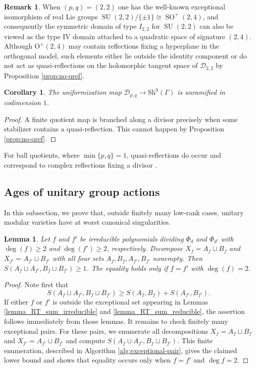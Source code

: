 \documentclass[11pt]{amsart}
\theoremstyle{plain}
\newtheorem{lem}[thm]{Lemma}
\newtheorem{cor}[thm]{Corollary}
\theoremstyle{definition}
\newtheorem{rem}[thm]{Remark}
\numberwithin{equation}{section}
\def\SU{\mathop{\mathrm{SU}}\nolimits}
\def\SO{\mathop{\mathrm{SO}}\nolimits}
\def\SU{\mathop{\mathrm{SU}}\nolimits}
\def\O{\mathrm{O}}
\begin{document}
\begin{rem}
  When $(p,q)=(2,2)$ one has the well-known exceptional isomorphism of real Lie groups
    $\SU(2,2)/\{\pm 1\}  \cong \SO^+(2,4)$,
  and consequently the symmetric domain of type $I_{2,2}$ for $\SU(2,2)$ can also be viewed as the
  type IV domain attached to a quadratic space of signature $(2,4)$.
  Although $\O^+(2,4)$ may contain reflections fixing a hyperplane in the orthogonal model, such elements either lie outside the identity component or do not
  act as quasi-reflections on the holomorphic tangent space of $\mathcal{D}_{2,2}$ by Proposition \ref{prop:no-qref}.
\end{rem}

\begin{cor}\label{cor:branch-codimge2}
  The uniformization map $\mathcal{D}_{p,q}\to \mathrm{Sh}^0(\Gamma)$ is unramified in codimension $1$.
\end{cor}

\begin{proof}
  A finite quotient map is branched along a divisor precisely when some stabilizer contains a quasi-reflection.
  This cannot happen by Proposition \ref{prop:no-qref}.
\end{proof}
For ball quotients, where $\min\{p,q\}=1$, quasi-reflections do occur and correspond
to complex reflections fixing a divisor \cites{behrens2012singularities,maeda2024reflective}.

\subsection{Ages of unitary group actions}
\label{sec:ages_unitary_actions}
In this subsection, we prove that, outside finitely many low-rank cases, unitary modular varieties have at worst canonical singularities.

\begin{lem}\label{lemma_S_AA_BB}
  Let $f$ and $f'$ be irreducible polynomials dividing $\Phi_d$ and $\Phi_{d'}$ with $\deg(f) \geq 2$ and $\deg(f') \geq 2$, respectively.
  Decompose $X_f=A_f\sqcup B_f$ and $X_{f'}=A_{f'}\sqcup B_{f'}$
  with all four sets $A_f,B_f,A_{f'},B_{f'}$ nonempty.  Then $S(A_f \sqcup A_{f'}, B_{f} \sqcup B_{f'}) \geq 1$.
  The equality holds only if $f=f'$ with $\deg(f) =2$.
\end{lem}
\begin{proof}
  Note first that
  \[
    S(A_f \sqcup A_{f'}, B_f \sqcup B_{f'}) \geq S(A_f, B_f) + S(A_{f'},B_{f'}).
  \]
  If either $f$ or $f'$ is outside the exceptional set appearing in Lemmas \ref{lemma_RT_sum_irreducible} and \ref{lemma_RT_sum_reducible}, the assertion follows immediately from those lemmas. It remains to check finitely many exceptional pairs. For these pairs, we enumerate all decompositions $X_f=A_f\sqcup B_f$ and $X_{f'}=A_{f'}\sqcup B_{f'}$ and compute 
$S(A_f\sqcup A_{f'},B_f\sqcup B_{f'})$.
  This finite enumeration, described in Algorithm \ref{alg:exceptional-pair}, gives the claimed lower bound and shows that equality occurs only when $f=f'$ and $\deg f = 2$.
\end{proof}
\end{document}
